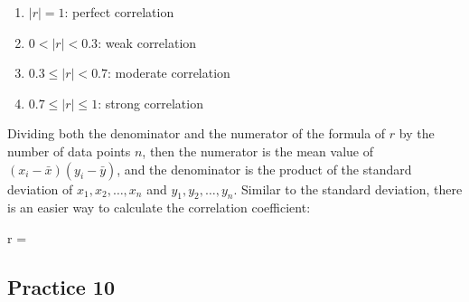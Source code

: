 \documentclass{report}
\begin{document}
\begin{multicols}{2}
  \begin{enumerate}
    \item $|r| = 1$: perfect correlation
    \item $0 < |r| < 0.3$: weak correlation
    \item $0.3 \leq |r| < 0.7$: moderate correlation
    \item $0.7 \leq |r| \leq 1$: strong correlation
  \end{enumerate}

  Dividing both the denominator and the numerator of the formula of $r$ by the
  number of data points $n$, then the numerator is the mean value of $(x_i -
    \bar{x})(y_i - \bar{y})$, and the denominator is the product of the standard
  deviation of $x_1, x_2, \dots, x_n$ and $y_1, y_2, \dots, y_n$. Similar to the
  standard deviation, there is an easier way to calculate the correlation
  coefficient:

  \begin{cequation}
    r = 
  \end{cequation}

  \subsection{Practice 10}


\end{multicols}
\end{document}
